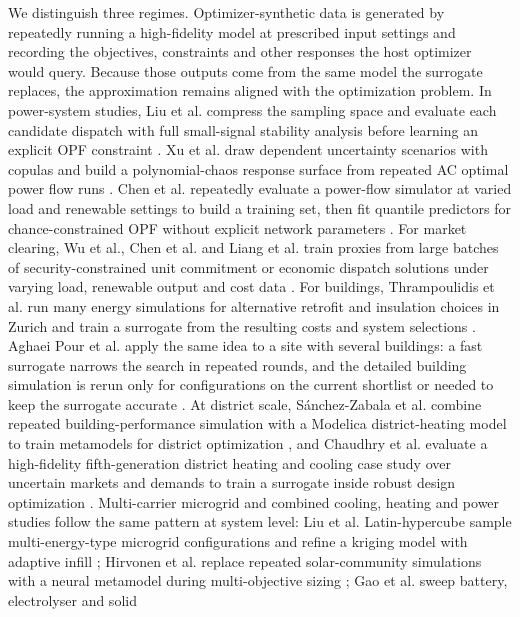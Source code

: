 We distinguish three regimes. Optimizer-synthetic data is
generated by repeatedly running a high-fidelity model at prescribed
input settings and recording the objectives, constraints and other
responses the host optimizer would query. Because those outputs come
from the same model the surrogate replaces, the approximation remains
aligned with the optimization problem. In power-system studies, Liu
et al. compress the sampling space and evaluate each candidate dispatch
with full small-signal stability analysis before learning an explicit
OPF constraint \cite{Liu20223726}. Xu et al. draw dependent uncertainty
scenarios with copulas and build a polynomial-chaos response surface
from repeated AC optimal power flow runs \cite{Xu20212696}. Chen et al.
repeatedly evaluate a power-flow simulator at varied load and renewable
settings to build a training set, then fit quantile predictors for
chance-constrained OPF without explicit network parameters
\cite{Chen2023657}. For market clearing, Wu et al., Chen et al. and
Liang et al. train proxies from large batches of
security-constrained unit commitment or economic dispatch solutions
under varying load, renewable output and cost data
\cite{Wu2022231,Chen2022,Liang20246508}. For buildings, Thrampoulidis
et al. run many energy simulations for alternative retrofit and
insulation choices in Zurich and train a surrogate from the resulting
costs and system selections \cite{Thrampoulidis2021}. Aghaei Pour et al.
apply the same idea to a site with several buildings: a fast surrogate
narrows the search in repeated rounds, and the detailed building
simulation is rerun only for configurations on the current shortlist or
needed to keep the surrogate accurate \cite{Aghaei Pour2022303}. At district scale, Sánchez-Zabala
et al. combine repeated building-performance simulation with a Modelica
district-heating model to train metamodels for district optimization
\cite{Sánchez-Zabala2024}, and Chaudhry et al. evaluate a
high-fidelity fifth-generation district heating and cooling case study
over uncertain markets and demands to train a surrogate inside robust
design optimization \cite{Chaudhry2024}. Multi-carrier microgrid
and combined cooling, heating and power studies follow the same pattern
at system level: Liu et al. Latin-hypercube sample multi-energy-type
microgrid configurations and refine a kriging model with adaptive infill
\cite{Liu201914569}; Hirvonen et al. replace repeated solar-community
simulations with a neural metamodel during multi-objective sizing
\cite{Hirvonen2017323}; Gao et al. sweep battery, electrolyser and solid
